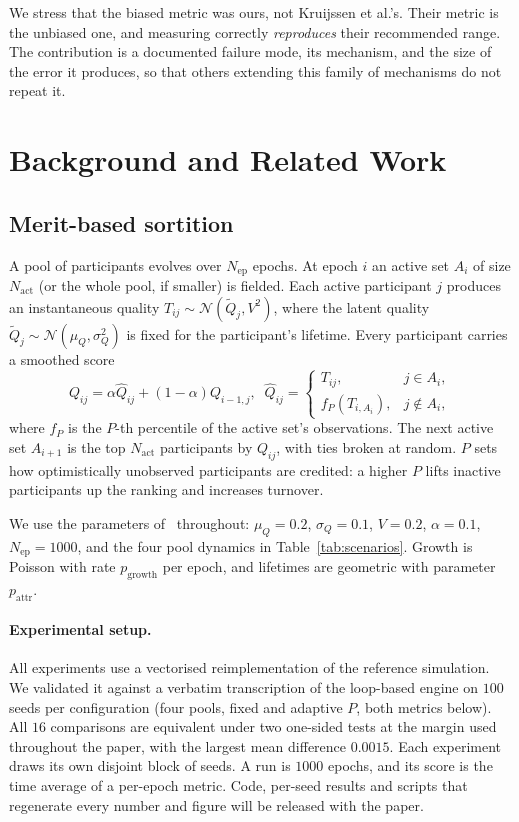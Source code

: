 \documentclass[sigconf,anonymous,review,nonacm]{acmart}
\begin{document}
We stress that the biased metric was ours, not Kruijssen et al.'s. Their metric is the
unbiased one, and measuring correctly \emph{reproduces} their recommended range. The
contribution is a documented failure mode, its mechanism, and the size of the error it
produces, so that others extending this family of mechanisms do not repeat it.

\section{Background and Related Work}
\label{sec:background}

\subsection{Merit-based sortition}
A pool of participants evolves over $N_{\mathrm{ep}}$ epochs. At epoch $i$ an active
set $A_i$ of size $N_{\mathrm{act}}$ (or the whole pool, if smaller) is fielded. Each active
participant $j$ produces an instantaneous quality $T_{ij}\sim\mathcal N(\tilde Q_j,V^2)$,
where the latent quality $\tilde Q_j\sim\mathcal N(\mu_Q,\sigma_Q^2)$ is fixed for the
participant's lifetime. Every participant carries a smoothed score
\begin{equation}\label{eq:ema}
Q_{ij}=\alpha\hat Q_{ij}+(1-\alpha)Q_{i-1,j},\;\;
\hat Q_{ij}=\begin{cases}T_{ij}, & j\in A_i,\\ f_P(T_{i,A_i}), & j\notin A_i,\end{cases}
\end{equation}
where $f_P$ is the $P$-th percentile of the active set's observations. The next active set
$A_{i+1}$ is the top $N_{\mathrm{act}}$ participants by $Q_{ij}$, with ties broken at
random. $P$ sets how optimistically unobserved participants are credited: a higher $P$
lifts inactive participants up the ranking and increases turnover.

We use the parameters of~\cite{kruijssen2024} throughout: $\mu_Q=0.2$, $\sigma_Q=0.1$,
$V=0.2$, $\alpha=0.1$, $N_{\mathrm{ep}}=1000$, and the four pool dynamics in
Table~\ref{tab:scenarios}. Growth is Poisson with rate $p_{\mathrm{growth}}$ per epoch,
and lifetimes are geometric with parameter $p_{\mathrm{attr}}$.

\paragraph{Experimental setup.} All experiments use a vectorised reimplementation of the
reference simulation. We validated it against a verbatim transcription of the loop-based
engine on $100$ seeds per configuration (four pools, fixed and adaptive $P$, both metrics
below). All $16$ comparisons are equivalent under two one-sided tests at the margin used
throughout the paper, with the largest mean difference $0.0015$. Each experiment draws its
own disjoint block of seeds. A run is $1000$ epochs, and its score is the time average of a
per-epoch metric. Code, per-seed results and scripts that regenerate every number and figure
will be released with the paper.
\end{document}
